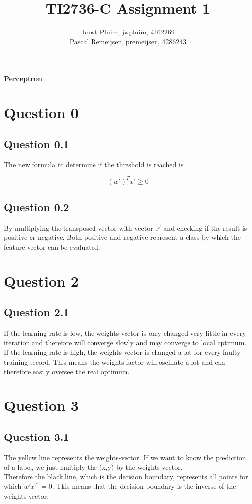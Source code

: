 \documentclass[11pt,twoside,a4paper]{article}
\title{TI2736-C Assignment 1}
\author{
	Joost Pluim, jwpluim, 4162269 \\
	Pascal Remeijsen, premeijsen, 4286243
}
\begin{document}
\maketitle
\clearpage

\textbf{Perceptron}

\section{Question 0}
	
	\subsection{Question 0.1}
	The new formula to determine if the threshold is reached is
	
	\begin{equation}
		(w')^T x' \geq 0
	\end{equation}
	
	\subsection{Question 0.2}
	By multiplying the transposed vector with vector $x'$ and checking if the result is positive or negative. Both positive and negative represent a class by which the feature vector can be evaluated. 
				
\section{Question 2}

	\subsection{Question 2.1}
	If the learning rate is low, the weights vector is only changed very little in every iteration and therefore will converge slowly and may converge to local optimum.\\
	If the learning rate is high, the weights vector is changed a lot for every faulty training record. This means the weights factor will oscillate a lot and can therefore easily oversee the real optimum.
	
\section{Question 3}

	\subsection{Question 3.1}
	The yellow line represents the weights-vector. If we want to know the prediction of a label, we just multiply the (x,y) by the weights-vector. \\
	Therefore the black line, which is the decision boundary, represents all points for which $w' x^{T'} = 0$. This means that the decision boundary is the inverse of the weights vector.  
	
\end{document}
